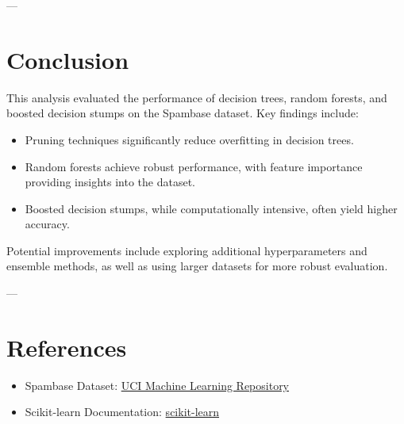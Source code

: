 \documentclass[12pt]{article}
\begin{document}
---

\section{Conclusion}
This analysis evaluated the performance of decision trees, random forests, and boosted decision stumps on the Spambase dataset. Key findings include:
\begin{itemize}
    \item Pruning techniques significantly reduce overfitting in decision trees.
    \item Random forests achieve robust performance, with feature importance providing insights into the dataset.
    \item Boosted decision stumps, while computationally intensive, often yield higher accuracy.
\end{itemize}
Potential improvements include exploring additional hyperparameters and ensemble methods, as well as using larger datasets for more robust evaluation.

---

\section{References}
\begin{itemize}
    \item Spambase Dataset: \href{https://archive.ics.uci.edu/ml/datasets/Spambase}{UCI Machine Learning Repository}
    \item Scikit-learn Documentation: \href{https://scikit-learn.org/}{scikit-learn}
\end{itemize}
\end{document}
